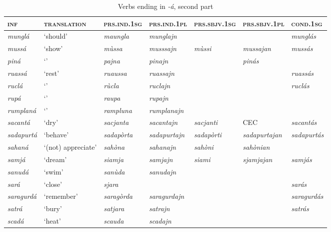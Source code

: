\begin{sidewaystable} 
	\caption{Verbs ending in \textit{-á}, second part}

	\begin{tabularx}{\textwidth}{lllllll} 
		\lsptoprule
		\textsc{\textbf{inf}} & \textsc{\textbf{translation}} & \textsc{\textbf{prs.ind.1sg}} & \textsc{\textbf{prs.ind.1pl}} & \textsc{\textbf{prs.sbjv.1sg}} & \textsc{\textbf{prs.sbjv.1pl}} & \textsc{\textbf{cond.1sg}}\\
		\midrule
		\textit{munglá} & ‘should’ & \textit{maungla} & \textit{munglajn} & & & \textit{munglás}\\
		\textit{mussá} & ‘show’ & \textit{mùssa} & \textit{musssajn} & \textit{mùssi} & \textit{mussajan} & \textit{mussás}\\ 
		\textit{piná} & `' & \textit{pajna} & \textit{pinajn} & & \textit{pinás}\\
		\textit{ruassá} &`rest' & \textit{ruaussa} & \textit{ruassajn} & & & \textit{ruassás}\\
		\textit{ruclá} & `' & \textit{rùcla} & \textit{ruclajn} & & & \textit{ruclás}\\
		\textit{rupá} & `' & \textit{raupa} & \textit{rupajn} \\
		\textit{rumplaná} & `' & \textit{rampluna} & \textit{rumplanajn} \\
		\textit{sacantá} & ‘dry’ & \textit{sacjanta} & \textit{sacantajn} & \textit{sacjanti} & CEC & \textit{sacantás}\\
		\textit{sadapurtá} & ‘behave’ & \textit{sadapòrta} & \textit{sadapurtajn} & \textit{sadapòrti} & \textit{sadapurtajan} & \textit{sadapurtás}\\
		\textit{sahaná} & ‘(not) appreciate’ & \textit{sahòna} & \textit{sahanajn} & \textit{sahòni} & \textit{sahònian}\\ 
		\textit{samjá} & ‘dream’ & \textit{siamja} & \textit{samjajn} & \textit{siami} & \textit{sjamjajan} & \textit{samjás}\\ 
		\textit{sanudá} & `swim' & \textit{sanùda} & \textit{sanudajn} \\
		\textit{sará} & `close' & \textit{sjara} & & & & \textit{sarás} \\
		\textit{saragurdá} & `remember' & \textit{saragòrda} & \textit{saragurdajn} & & & \textit{saragurdás}\\
		\textit{satrá} & `bury' & \textit{satjara} & \textit{satrajn} & & & \textit{satrás}\\
		\textit{scadá} & `heat' & \textit{scauda} & \textit{scadajn}\\

\end{tabularx}
\end{sidewaystable}
